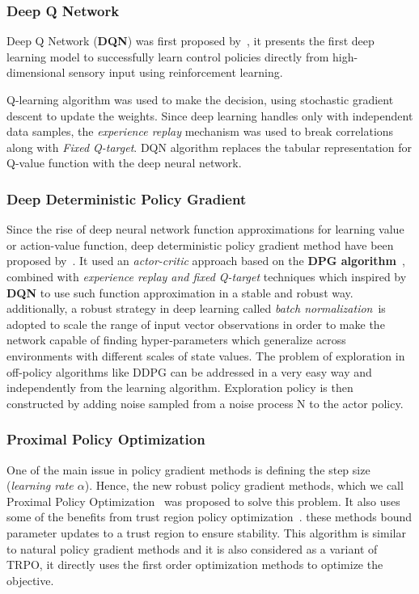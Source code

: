 \subsubsection{Deep Q Network}
Deep Q Network (\textbf{DQN}) was first proposed by~\parencite{mnih2013playing}, it presents the first deep learning model to successfully learn control policies directly from high-dimensional sensory input using reinforcement learning.

Q-learning algorithm was used to make the decision, using stochastic gradient descent to update the weights. Since deep learning handles only with independent data samples, the \textit{experience replay} mechanism was used to break correlations along with \textit{Fixed Q-target}. DQN algorithm replaces the tabular representation for Q-value function with the deep neural network.

\subsubsection{Deep Deterministic Policy Gradient}
Since the rise of deep neural network function approximations for learning value or action-value function, deep deterministic policy gradient method have been proposed by~\parencite{lillicrap2015continuous}. It used an \textit{actor-critic} approach based on the \textbf{DPG algorithm}~\parencite{silver2014deterministic}, combined with \textit{experience replay and fixed Q-target} techniques which inspired by \textbf{DQN} to use such function approximation in a stable and robust way. additionally, a robust strategy in deep learning called \textit{batch normalization}~\parencite{ioffe2015batch}is  adopted to scale the range of input vector observations in order to make the network capable of finding hyper-parameters which generalize across environments with different scales of state values.
The problem of exploration in off-policy algorithms like DDPG can be addressed in a very easy way and independently from the learning algorithm. Exploration policy is then constructed by adding noise sampled from a noise process N to the actor policy.

\subsubsection{Proximal Policy Optimization}
One of the main issue in policy gradient methods is defining the step size (\textit{learning rate $\alpha$}). Hence, the new robust policy gradient methods, which we call Proximal Policy Optimization~\parencite{schulman2017proximal, heess2017emergence} was proposed to solve this problem. It also uses some of the benefits from trust region policy optimization~\parencite{schulman2015trust}. these methods bound parameter updates to a trust region to ensure stability.
This algorithm is similar to natural policy gradient methods and it is also considered as a variant of TRPO, it directly uses the first order optimization methods to optimize the objective.

